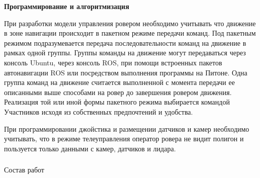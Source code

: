 \textbf{Программирование и алгоритмизация}

При разработки модели управления ровером необходимо учитывать что движение в зоне навигации происходит в пакетном режиме передачи команд. Под пакетным режимом подразумевается передача последовательности команд на движение в рамках одной группы. Группы команды на движение могут передаваться через консоль Ubuntu, через консоль ROS, при помощи встроенных пакетов автонавигации ROS или посредством выполнения программы на Питоне. Одна группа команд на движение считается выполненной с момента передачи ее описанными выше способами на ровер до завершения ровером движения.  Реализация той или иной формы пакетного режима выбирается командой Участников исходя из собственных предпочтений и удобства.

При программировании джойстика и размещении датчиков и камер необходимо учитывать, что в режиме телеуправления оператор ровера не видит полигон и пользуется только данными с камер, датчиков и лидара.

\subsubsection*{}{Состав работ}


